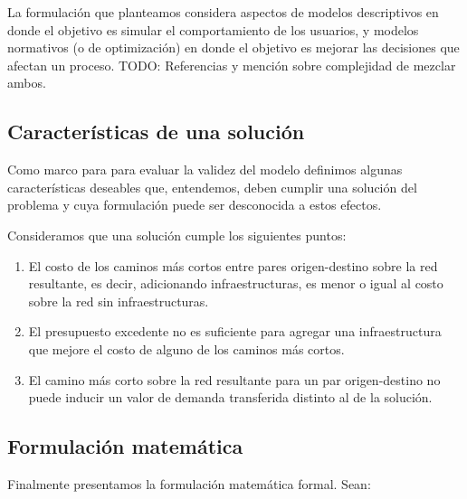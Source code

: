 \documentclass{article}
\begin{document}
  La formulación que planteamos considera aspectos de modelos descriptivos en donde el objetivo es simular el comportamiento de los usuarios, y modelos normativos (o de optimización) en donde el objetivo es mejorar las decisiones que afectan un proceso. TODO: Referencias y mención sobre complejidad de mezclar ambos.

  \subsection{Características de una solución}

  Como marco para para evaluar la validez del modelo definimos algunas características deseables que, entendemos, deben cumplir una solución del problema y cuya formulación puede ser desconocida a estos efectos.

  Consideramos que una solución cumple los siguientes puntos:

  \begin{enumerate}
      \item{El costo de los caminos más cortos entre pares origen-destino sobre la red resultante, es decir, adicionando infraestructuras, es menor o igual al costo sobre la red sin infraestructuras.}
    \item{\label{budgetexcess} El presupuesto excedente no es suficiente para agregar una infraestructura que mejore el costo de alguno de los caminos más cortos.}
    \item{El camino más corto sobre la red resultante para un par origen-destino no puede inducir un valor de demanda transferida distinto al de la solución.}
  \end{enumerate}

  \subsection{Formulación matemática}

  Finalmente presentamos la formulación matemática formal. Sean:
\end{document}
